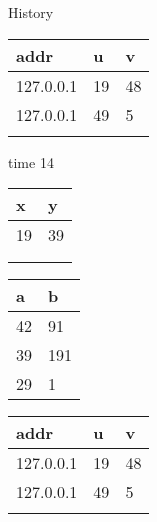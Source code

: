 \begin{block}{History}
\begin{center}
\begin{minipage}{0.3\textwidth}
      \vspace{0.5cm}

      \begin{tabularx}{\textwidth}{|X|l|l|}
        \hline\rowcolor{blue!20}
        \textbf{addr}  & \textbf{u} & \textbf{v} \\\hline
        127.0.0.1 & 19         & 48 \\\hline
        127.0.0.1 & 49         & 5 \\\hline
                  &            &   \\\hline
      \end{tabularx}
    \end{minipage}
    \hfill
    \begin{minipage}{0.3\textwidth}
      time 14

      \vspace{0.5cm}

      \begin{tabularx}{0.47\textwidth}{|X|X|}
        \hline\rowcolor{red!20}
        \textbf{x} & \textbf{y} \\\hline
        19         & 39 \\\hline
                   &   \\\hline
                   &    \\\hline
      \end{tabularx}
      \hfill
      \begin{tabularx}{0.47\textwidth}{|X|X|}
        \hline\rowcolor{green!20}
        \textbf{a} & \textbf{b} \\\hline
        42          & 91 \\\hline
        39         & 191 \\\hline
        29         & 1 \\\hline
      \end{tabularx}

      \vspace{0.5cm}

      \begin{tabularx}{\textwidth}{|X|l|l|}
        \hline\rowcolor{blue!20}
        \textbf{addr}  & \textbf{u} & \textbf{v} \\\hline
        127.0.0.1 & 19         & 48 \\\hline
        127.0.0.1 & 49         & 5 \\\hline
                  &            &   \\\hline
      \end{tabularx}
    \end{minipage}
  \end{center}
\end{block}
